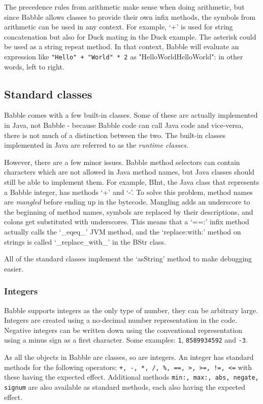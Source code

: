\documentclass[a4paper]{article}
\begin{document}
The precedence rules from arithmetic make sense when doing arithmetic, but since Babble allows classes to provide their own infix methods, the symbols from arithmetic can be used in any context.
For example, `+' is used for string concatenation but also for Duck mating in the Duck example.
The asterisk could  be used as a string repeat method.
In that context, Babble will evaluate an expression like \texttt{"Hello" + "World" * 2} as "HelloWorldHelloWorld": in other words, left to right.

\subsection{Standard classes}

Babble comes with a few built-in classes. Some of these are actually implemented in Java, not Babble - because Babble code can call Java code and vice-versa, there is not much of a distinction between the two. The built-in classes implemented in Java are referred to as the \emph{runtime classes}.

However, there are a few minor issues. Babble method selectors can contain characters which are not allowed in Java method names, but Java classes should still be able to implement them. For example, BInt, the Java class that represents a Babble integer, has methods `+' and `-'. To solve this problem, method names are \emph{mangled} before ending up in the bytecode. Mangling adds an underscore to the beginning of method names, symbols are replaced by their descriptions, and colons get substituted with underscores. This means that a `==:' infix method actually calls the `\_eqeq\_' JVM method, and the `replace:with:' method on strings is called `\_replace\_with\_' in the BStr class.

All of the standard classes implement the `asString' method to make debugging easier.

\subsubsection{Integers}

Babble supports integers as the only type of number, they can be arbitrary large. Integers are created using a no-decimal number representation in the code. Negative integers can be written down using the conventional representation using a minus sign as a first character. Some examples:
\texttt{1}, \texttt{8589934592} and \texttt{-3}.

As all the objects in Babble are classes, so are integers. An integer has standard methods for the following operators: \texttt{+, -, *, /, \%, ==, >, >=, !=, <=} with these having the expected effect. Additional methods \texttt{min:, max:, abs, negate, signum} are also available as standard methods, each also having the expected effect.
\end{document}
